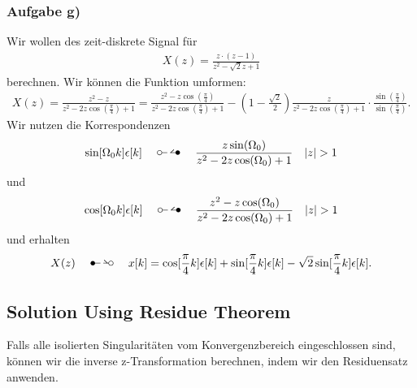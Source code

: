 \subsubsection{Aufgabe g)}
Wir wollen des zeit-diskrete Signal für
\begin{align}
	X(z)=\frac{z\cdot(z-1)}{z^2-\sqrt{2}z+1}
\end{align}
berechnen.
Wir können die Funktion umformen:
\begin{align}
	X(z)=\frac{z^2-z}{z^2-2z\cos(\frac{\pi}{4})+1}=\frac{z^2-z\cos(\frac{\pi}{4})}{z^2-2z\cos(\frac{\pi}{4})+1}-(1-\frac{\sqrt{2}}{2})\frac{z}{z^2-2z\cos(\frac{\pi}{4})+1}\cdot\frac{\sin(\frac{\pi}{4})}{\sin(\frac{\pi}{4})}.
\end{align}
Wir nutzen die Korrespondenzen
\begin{align}
	\sin[\Omega_0k]\epsilon[k]\quad\ztransf\quad\frac{z\sin(\Omega_0)}{z^2-2z\cos(\Omega_0)+1}\quad |z| > 1
\end{align}
und
\begin{align}
	\cos[\Omega_0k]\epsilon[k]\quad\ztransf\quad\frac{z^2-z\cos(\Omega_0)}{z^2-2z\cos(\Omega_0)+1}\quad |z| > 1
\end{align}
und erhalten
\begin{align}
	X(z)\quad\Ztransf\quad x[k]=\cos[\frac{\pi}{4}k]\epsilon[k]+\sin[\frac{\pi}{4}k]\epsilon[k]-\sqrt{2}\sin[\frac{\pi}{4}k]\epsilon[k].
\end{align}
\subsection{Solution Using Residue Theorem}
Falls alle isolierten Singularitäten vom Konvergenzbereich eingeschlossen sind, können wir die inverse z-Transformation berechnen, indem wir den Residuensatz anwenden.
